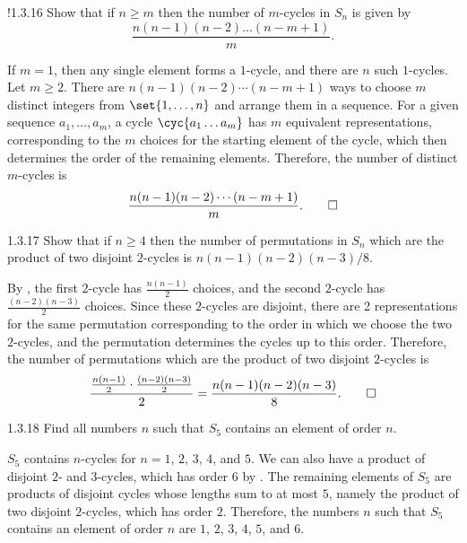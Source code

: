 \begin{exercise}!{1.3.16}
    Show that if $n \geq m$ then the number of $m$-cycles in $S_n$ is given by
    \[
    	\frac{n(n-1)(n-2)\dots(n-m+1)}{m}.
    \]
\end{exercise}

\begin{sol}
    If $m = 1$, then any single element forms a $1$-cycle, and there are $n$ such $1$-cycles.
    Let $m \geq 2$.
    There are $n(n - 1)(n - 2)\cdots(n - m + 1)$ ways to choose $m$ distinct integers from $\set{1, \ldots, n}$ and arrange them in a sequence.
    For a given sequence $a_1, \ldots, a_m$, a cycle $\cyc{a_1 \ldots a_m}$ has $m$ equivalent representations, corresponding to the $m$ choices for the starting element of the cycle, which then determines the order of the remaining elements.
    Therefore, the number of distinct $m$-cycles is 
    \[
        \frac{n(n - 1)(n - 2)\cdots(n - m + 1)}{m}. \qedhere
    \]
\end{sol}

\begin{exercise}{1.3.17}
    Show that if $n \geq 4$ then the number of permutations in $S_n$ which are the product of two disjoint $2$-cycles is $n(n - 1)(n - 2)(n - 3)/8$.
\end{exercise}

\begin{sol}
    By , the first $2$-cycle has $\frac{n(n - 1)}{2}$ choices, and the second $2$-cycle has $\frac{(n - 2)(n - 3)}{2}$ choices.
    Since these $2$-cycles are disjoint, there are 2 representations for the same permutation corresponding to the order in which we choose the two $2$-cycles, and the permutation determines the cycles up to this order.
    Therefore, the number of permutations which are the product of two disjoint $2$-cycles is
    \[
        \frac{\frac{n(n - 1)}{2} \cdot \frac{(n - 2)(n - 3)}{2}}{2} = \frac{n(n - 1)(n - 2)(n - 3)}{8}. \qedhere
    \]
\end{sol}

\begin{exercise}{1.3.18}
    Find all numbers $n$ such that $S_5$ contains an element of order $n$.
\end{exercise}

\begin{sol}
    $S_5$ contains $n$-cycles for $n = 1$, $2$, $3$, $4$, and $5$.
    We can also have a product of disjoint $2$- and $3$-cycles, which has order $6$ by .
    The remaining elements of $S_5$ are products of disjoint cycles whose lengths sum to at most $5$, namely the product of two disjoint $2$-cycles, which has order $2$.
    Therefore, the numbers $n$ such that $S_5$ contains an element of order $n$ are $1$, $2$, $3$, $4$, $5$, and $6$.
\end{sol}

